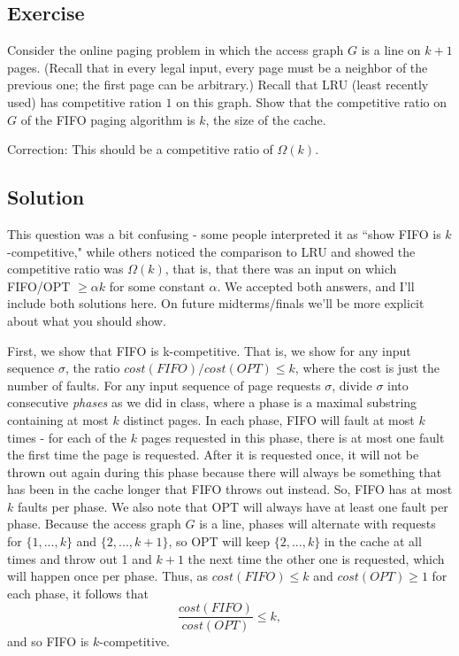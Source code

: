 \documentclass{article}
\newcounter{counter}
\newcommand{\Exercise}{Exercise \stepcounter{counter}\thecounter}
\begin{document}
\subsection*{\Exercise}
  Consider the online paging problem in which the access graph $G$ is a line
  on $k+1$ pages. (Recall that in every legal input, every page must be a
  neighbor of the previous one; the first page can be arbitrary.) Recall that
  LRU (least recently used) has competitive ration $1$ on this graph. Show that the competitive
  ratio on $G$ of the FIFO paging algorithm is $k$, the size of the cache.

  Correction: This should be a competitive ratio of $\Omega(k)$.


\subsection*{Solution}
    This question was a bit confusing - some people interpreted it as ``show FIFO is $k$-competitive," while others noticed the comparison to LRU and showed the competitive ratio was $\Omega(k)$, that is, that there was an input on which FIFO/OPT $\geq \alpha k$ for some constant $\alpha$. We accepted both answers, and I'll include both solutions here. On future midterms/finals we'll be more explicit about what you should show.

    \vspace{3mm}
    First, we show that FIFO is k-competitive. That is, we show for any input sequence $\sigma$, the ratio $cost(FIFO)/cost(OPT) \leq k$, where the cost is just the number of faults. For any input sequence of page requests $\sigma$, divide $\sigma$ into consecutive {\it phases} as we did in class, where a phase is a maximal substring containing at most $k$ distinct pages. In each phase, FIFO will fault at most $k$ times - for each of the $k$ pages requested in this phase, there is at most one fault the first time the page is requested. After it is requested once, it will not be thrown out again during this phase because there will always be something that has been in the cache longer that FIFO throws out instead. So, FIFO has at most $k$ faults per phase. We also note that OPT will always have at least one fault per phase. Because the access graph $G$ is a line, phases will alternate with requests for $\{1,...,k\}$ and $\{2,...,k+1\}$, so OPT will keep $\{2,...,k\}$ in the cache at all times and throw out 1 and $k+1$ the next time the other one is requested, which will happen once per phase. Thus, as $cost(FIFO) \leq k$ and $cost(OPT)\geq 1$ for each phase, it follows that $$\frac{cost(FIFO)}{cost(OPT)} \leq k,$$ and so FIFO is $k$-competitive. 
\end{document}
